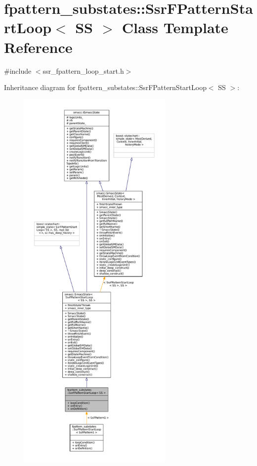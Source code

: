 \hypertarget{structfpattern__substates_1_1SsrFPatternStartLoop}{}\section{fpattern\+\_\+substates\+:\+:Ssr\+F\+Pattern\+Start\+Loop$<$ SS $>$ Class Template Reference}
\label{structfpattern__substates_1_1SsrFPatternStartLoop}


{\ttfamily \#include $<$ssr\+\_\+fpattern\+\_\+loop\+\_\+start.\+h$>$}



Inheritance diagram for fpattern\+\_\+substates\+:\+:Ssr\+F\+Pattern\+Start\+Loop$<$ SS $>$\+:
\nopagebreak
\begin{figure}[H]
\begin{center}
\leavevmode
\includegraphics[height=550pt]{structfpattern__substates_1_1SsrFPatternStartLoop__inherit__graph}
\end{center}
\end{figure}



